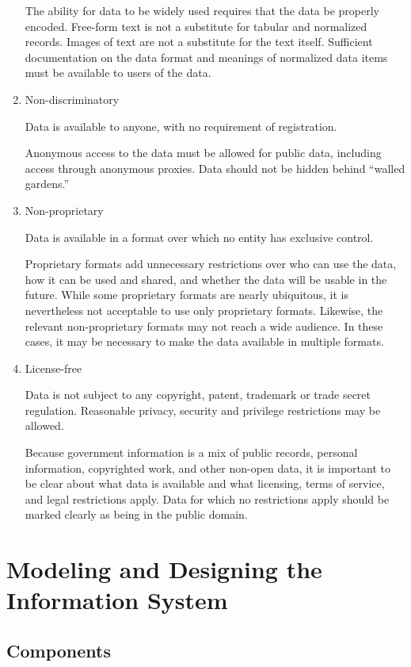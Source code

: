 \documentclass[12pt]{article}
\begin{document}
\begin{enumerate}
The ability for data to be widely used requires that the data be properly encoded. Free-form text is not a substitute for tabular and normalized records. Images of text are not a substitute for the text itself. Sufficient documentation on the data format and meanings of normalized data items must be available to users of the data.

\item Non-discriminatory

Data is available to anyone, with no requirement of registration.

Anonymous access to the data must be allowed for public data, including access through anonymous proxies. Data should not be hidden behind “walled gardens.”

\item Non-proprietary

Data is available in a format over which no entity has exclusive control.

Proprietary formats add unnecessary restrictions over who can use the data, how it can be used and shared, and whether the data will be usable in the future. While some proprietary formats are nearly ubiquitous, it is nevertheless not acceptable to use only proprietary formats. Likewise, the relevant non-proprietary formats may not reach a wide audience. In these cases, it may be necessary to make the data available in multiple formats.

\item License-free

Data is not subject to any copyright, patent, trademark or trade secret regulation. Reasonable privacy, security and privilege restrictions may be allowed.

Because government information is a mix of public records, personal information, copyrighted work, and other non-open data, it is important to be clear about what data is available and what licensing, terms of service, and legal restrictions apply. Data for which no restrictions apply should be marked clearly as being in the public domain.
\end{enumerate}

	
	
\newpage
\section{Modeling and Designing the Information System}

\subsection{Components}
\end{document}
